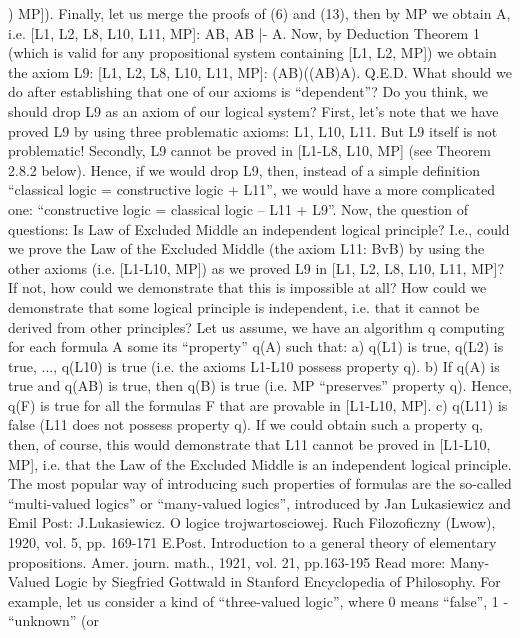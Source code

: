         ) MP]).
Finally, let us merge the proofs of (6) and (13), then by MP we obtain \neg A, i.e.
[L1, L2, L8, L10, L11, MP]: A\IMPLIES B, A\IMPLIES \neg B |- \neg A.
Now, by Deduction Theorem 1 (which is valid for any propositional system containing [L1, L2, MP]) we
obtain the axiom L9:
[L1, L2, L8, L10, L11, MP]: (A\IMPLIES B)\IMPLIES ((A\IMPLIES \neg B)\IMPLIES \neg A).
Q.E.D.
What should we do after establishing that one of our axioms is ``dependent''?
Do you think, we should drop L9 as an axiom of our logical system?
First, let's note that we have proved L9 by using three problematic axioms: L1, L10, L11. But L9 itself is
not problematic!
Secondly, L9 cannot be proved in [L1-L8, L10, MP] (see Theorem 2.8.2 below). Hence, if we would drop
L9, then, instead of a simple definition
``classical logic = constructive logic + L11'',
we would have a more complicated one:
``constructive logic = classical logic – L11 + L9''.
Now, the question of questions:
Is Law of Excluded Middle an independent logical principle?
I.e., could we prove the Law of the Excluded Middle (the axiom L11: Bv\neg B) by using the other axioms
(i.e. [L1-L10, MP]) as we proved L9 in [L1, L2, L8, L10, L11, MP]? If not, how could we demonstrate that
this is impossible at all? How could we demonstrate that some logical principle is independent, i.e. that it
cannot be derived from other principles?
Let us assume, we have an algorithm q computing for each formula A some its ``property'' q(A) such that:
a) q(L1) is true, q(L2) is true, ..., q(L10) is true (i.e. the axioms L1-L10 possess property q).
b) If q(A) is true and q(A\IMPLIES B) is true, then q(B) is true (i.e. MP ``preserves'' property q). Hence, q(F) is
true for all the formulas F that are provable in [L1-L10, MP].
c) q(L11) is false (L11 does not possess property q).
If we could obtain such a property q, then, of course, this would demonstrate that L11 cannot be proved in
[L1-L10, MP], i.e. that the Law of the Excluded Middle is an independent logical principle.
The most popular way of introducing such properties of formulas are the so-called ``multi-valued logics''
or ``many-valued logics'', introduced by Jan Lukasiewicz and Emil Post:
J.Lukasiewicz. O logice trojwartosciowej. Ruch Filozoficzny (Lwow), 1920, vol. 5, pp. 169-171
E.Post. Introduction to a general theory of elementary propositions. Amer. journ. math., 1921, vol. 21, pp.163-195
Read more: Many-Valued Logic by Siegfried Gottwald in Stanford Encyclopedia of Philosophy.
For example, let us consider a kind of ``three-valued logic'', where 0 means ``false'', 1 - ``unknown'' (or
